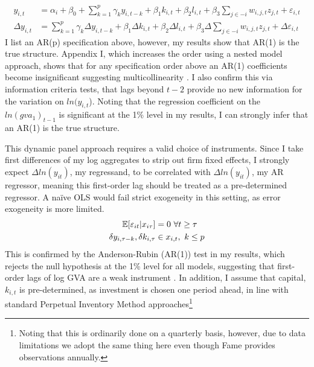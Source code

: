 \begin{align}
    y_{i,t} &= \alpha_i + \beta_0
                + \sum_{k=1}^p \gamma_k y_{i,t-k}
                + \beta_1 k_{i,t}
                + \beta_2 l_{i,t}
                + \beta_3 \sum_{j\in-i} w_{i,j,t}z_{j,t}
                + \varepsilon_{i,t}
    \\
    \Delta y_{i,t} &= \sum_{k=1}^p \gamma_k \Delta y_{i,t-k}
                + \beta_1 \Delta k_{i,t}
                + \beta_2 \Delta l_{i,t}
                + \beta_3 \Delta \sum_{j\in-i} w_{i,j,t}z_{j,t}
                + \Delta\varepsilon_{i,t}
\end{align}
%
I list an AR(p) specification above,
however, my results show that AR(1) is the true structure.
Appendix I, which increases the order using a nested model approach,
shows that for any specification order above an AR(1)
coefficients become insignificant suggesting multicollinearity .
I also confirm this via information criteria tests, 
that lags beyond $t-2$ provide no new information for the variation on $ln(y_{i,t}$).
Noting that the regression coefficient on the $ln(gva_1)_{t-1}$ is significant at the 1\% level
in my results, I can strongly infer that an AR(1) is the true structure.
\par
{}
\par
This dynamic panel approach requires a valid choice of instruments.
Since I take first differences of my log aggregates to strip out firm fixed effects,
I strongly expect $\Delta ln(y_{it})$, my regressand,
to be correlated with $\Delta ln(y_{it})$, my AR regressor,
meaning this first-order lag should be treated as a pre-determined regressor.
A naïve OLS would fail strict exogeneity in this setting, as error exogeneity is more limited.
\begin{align}
    \mathbb E[\varepsilon_{it}|x_{i\tau}] &=0\ \forall t\geq \tau
    \\
    \notag
    \delta y_{i,\tau-k}, \delta k_{i,\tau} &\in x_{i,t},\ k\leq p
\end{align}
This is confirmed by the Anderson-Rubin (AR(1)) test in my results,
which rejects the null hypothesis at the 1\% level for all models,
suggesting that first-order lags of log GVA are a weak instrument
.
In addition, I assume that capital, $k_{i,t}$ is pre-determined, as investment is chosen
one period ahead, in line with standard Perpetual Inventory Method approaches\footnote{
    Noting that this is ordinarily done on a quarterly basis,
    however, due to data limitations we adopt the same thing here even though Fame
    provides observations annually.
}
